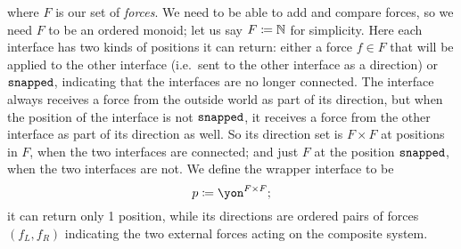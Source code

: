 \documentclass[Book-Poly]{subfiles}
\begin{document}
\begin{example}
\[\]
where $F$ is our set of \emph{forces}.
We need to be able to add and compare forces, so we need $F$ to be an ordered monoid; let us say $F\coloneqq\mathbb{N}$ for simplicity.
Here each interface has two kinds of positions it can return: either a force $f\in F$ that will be applied to the other interface (i.e.\ sent to the other interface as a direction) or $\texttt{snapped}$, indicating that the interfaces are no longer connected.
The interface always receives a force from the outside world as part of its direction, but when the position of the interface is not $\texttt{snapped}$, it receives a force from the other interface as part of its direction as well.
So its direction set is $F\times F$ at positions in $F$, when the two interfaces are connected; and just $F$ at the position $\texttt{snapped}$, when the two interfaces are not.
We define the wrapper interface to be
\[
    p\coloneqq\yon^{F\times F};
\]
it can return only 1 position, while its directions are ordered pairs of forces $(f_L, f_R)$ indicating the two external forces acting on the composite system.


\end{example}
\end{document}
